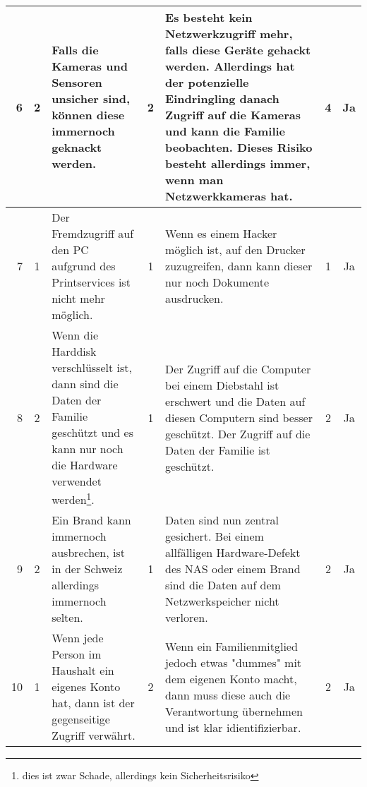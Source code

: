 \begin{landscape}
\begin{tabularx}{\columnwidth}{|r|c|X|c|X|c|c|}
		6 &  \cellcolor{yellow}2 & Falls die Kameras und Sensoren unsicher sind, können diese immernoch geknackt werden. & \cellcolor{yellow}2 & Es besteht kein Netzwerkzugriff mehr, falls diese Geräte gehackt werden. Allerdings hat der potenzielle Eindringling danach Zugriff auf die Kameras und kann die Familie beobachten. Dieses Risiko besteht allerdings immer, wenn man Netzwerkkameras hat. & \cellcolor{yellow}4 & \cellcolor{green} Ja  \\ \hline
		
		7 &  \cellcolor{green}1 & Der Fremdzugriff auf den PC aufgrund des Printservices ist nicht mehr möglich. & \cellcolor{green}1 & Wenn es einem Hacker möglich ist, auf den Drucker zuzugreifen, dann kann dieser nur noch Dokumente ausdrucken. & \cellcolor{green}1 & \cellcolor{green} Ja  \\ \hline
		
		8 &  \cellcolor{yellow}2 & Wenn die Harddisk verschlüsselt ist, dann sind die Daten der Familie geschützt und es kann nur noch die Hardware verwendet werden\footnote{dies ist zwar Schade, allerdings kein Sicherheitsrisiko}. & \cellcolor{green}1 & Der Zugriff auf die Computer bei einem Diebstahl ist erschwert und die Daten auf diesen Computern sind besser geschützt. Der Zugriff auf die Daten der Familie ist geschützt. & \cellcolor{green}2 & \cellcolor{green} Ja  \\ \hline
		
		9 &  \cellcolor{yellow}2 &  Ein Brand kann immernoch ausbrechen, ist in der Schweiz allerdings immernoch selten. & \cellcolor{green}1 & Daten sind nun zentral gesichert. Bei einem allfälligen Hardware-Defekt des NAS oder einem Brand sind die Daten auf dem Netzwerkspeicher nicht verloren. & \cellcolor{green}2 & \cellcolor{green} Ja  \\ \hline
		
		10 &  \cellcolor{green}1 & Wenn jede Person im Haushalt ein eigenes Konto hat, dann ist der gegenseitige Zugriff verwährt. & \cellcolor{yellow}2 & Wenn ein Familienmitglied jedoch etwas "dummes" mit dem eigenen Konto macht, dann muss diese auch die Verantwortung übernehmen und ist klar idientifizierbar. & \cellcolor{green}2 & \cellcolor{green} Ja  \\ \hline
		
	\end{tabularx}
	
	
\end{landscape}